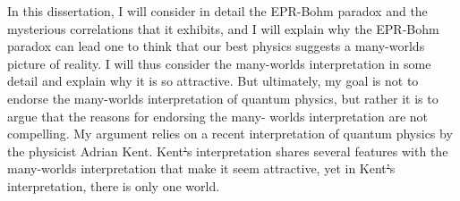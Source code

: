 \documentclass[12pt]{report}
\providecommand{\DIFadd}[1]{{\protect\color{blue}\uwave{#1}}} %
\providecommand{\DIFdel}[1]{{\protect\color{red}\sout{#1}}}                      %
\providecommand{\DIFaddbegin}{} %
\providecommand{\DIFaddend}{} %
\providecommand{\DIFdelbegin}{} %
\providecommand{\DIFdelend}{} %
\begin{document}
\vspace{12.96pt} %
 In this dissertation, I will consider in detail the EPR-Bohm paradox and the mysterious correlations that it exhibits, and I will explain why the EPR-Bohm paradox can lead one to think that our best physics suggests a many-worlds picture of reality. I will thus consider the many-worlds interpretation in some detail and explain why it is so attractive. But ultimately, my goal is not to endorse the many-worlds interpretation of quantum physics, but rather it is to argue that the reasons for endorsing the many- worlds interpretation are not compelling. My argument relies on a recent interpretation of quantum physics by the physicist Adrian Kent. Kent\DIFdelbegin \DIFdel{’}\DIFdelend \DIFaddbegin \DIFadd{'}\DIFaddend s interpretation shares several features with the many-worlds interpretation that make it seem attractive, yet in Kent\DIFdelbegin \DIFdel{’}\DIFdelend \DIFaddbegin \DIFadd{'}\DIFaddend s interpretation, there is only one world.




\pagebreak

\end{document}
